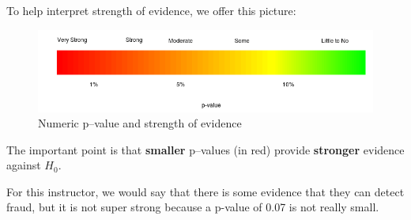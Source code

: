  To help interpret strength of evidence, we offer this picture:
 \begin{figure}[h]
   \centering
\includegraphics[width=\linewidth]{plots/pvalueStrengths.png}
   \caption{Numeric p--value and strength of evidence}
   \label{fig:SOE-pvalue}
 \end{figure}

  The important point is that {\bf smaller} p--values (in red) provide {\bf
    stronger} evidence against $H_0$. 

  For this instructor, we would say that there is some evidence that
  they can detect fraud, but it is not super strong because a p-value
  of 0.07 is not really small.

